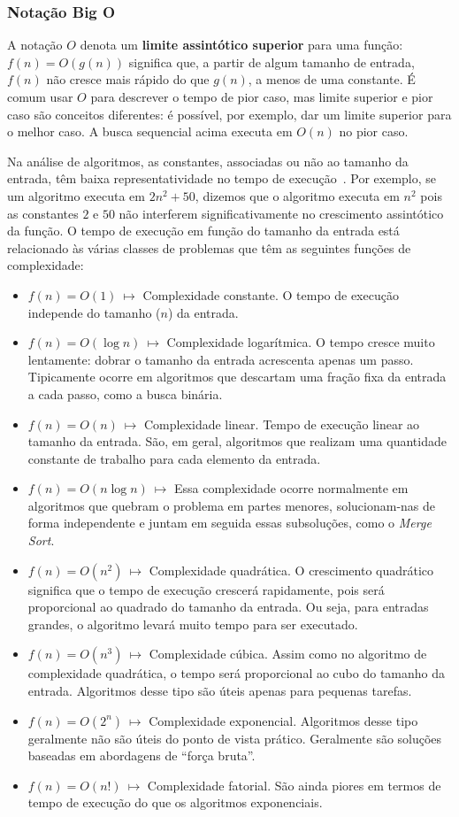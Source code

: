 \documentclass[11pt,fleqn]{book} %
\begin{document}
\subsubsection{Notação Big O}
A notação $O$ denota um \textbf{limite assintótico superior} para uma função: $f(n) = O(g(n))$ significa que, a partir de algum tamanho de entrada, $f(n)$ não cresce mais rápido do que $g(n)$, a menos de uma constante.
É comum usar $O$ para descrever o tempo de pior caso, mas limite superior e pior caso são conceitos diferentes: é possível, por exemplo, dar um limite superior para o melhor caso.
A busca sequencial acima executa em $O(n)$ no pior caso.

Na análise de algoritmos, as constantes, associadas ou não ao tamanho da entrada, têm baixa representatividade no tempo de execução~\cite{manber1989}.
Por exemplo, se um algoritmo executa em $2n^2+50$, dizemos que o algoritmo executa em $n^2$ pois as constantes $2$ e $50$ não interferem significativamente no crescimento assintótico da função.
O tempo de execução em função do tamanho da entrada está relacionado às várias classes de problemas que têm as seguintes funções de complexidade:
\begin{itemize}
\item $f(n) = O(1)~\mapsto$ Complexidade constante. O tempo de execução independe do tamanho ($n$) da entrada.
\item $f(n) = O(\log n)~\mapsto$ Complexidade logarítmica. O tempo cresce muito lentamente: dobrar o tamanho da entrada acrescenta apenas um passo. Tipicamente ocorre em algoritmos que descartam uma fração fixa da entrada a cada passo, como a busca binária.
\item $f(n) = O(n)~\mapsto$ Complexidade linear. Tempo de execução linear ao tamanho da entrada. São, em geral, algoritmos que realizam uma quantidade constante de trabalho para cada elemento da entrada.
\item $f(n) = O(n \log n)~\mapsto$ Essa complexidade ocorre normalmente em algoritmos que quebram o problema em partes menores, solucionam-nas de forma independente e juntam em seguida essas subsoluções, como o \textit{Merge Sort}.
\item $f(n) = O(n^2)~\mapsto$ Complexidade quadrática. O crescimento quadrático significa que o tempo de execução crescerá rapidamente, pois será proporcional ao quadrado do tamanho da entrada. Ou seja, para entradas grandes, o algoritmo levará muito tempo para ser executado.
\item $f(n) = O(n^3)~\mapsto$ Complexidade cúbica. Assim como no algoritmo de complexidade quadrática, o tempo será proporcional ao cubo do tamanho da entrada. Algoritmos desse tipo são úteis apenas para pequenas tarefas.
\item $f(n) = O(2^n)~\mapsto$ Complexidade exponencial. Algoritmos desse tipo geralmente não são úteis do ponto de vista prático. Geralmente são soluções baseadas em abordagens de ``força bruta''.
\item $f(n) = O(n!)~\mapsto$ Complexidade fatorial. São ainda piores em termos de tempo de execução do que os algoritmos exponenciais.
\end{itemize}
\end{document}
